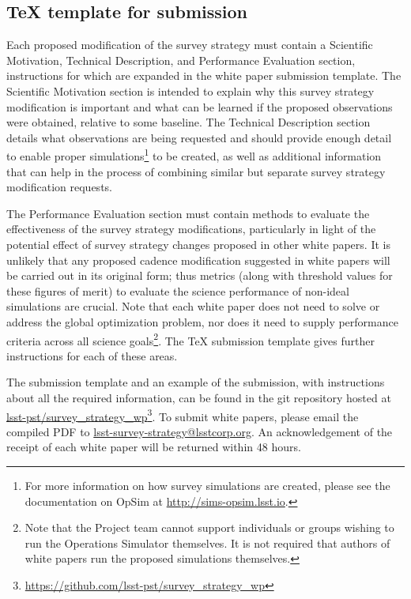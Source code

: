 \documentclass[DM,lsstdraft,toc,usenatbib]{lsstdoc}
\begin{document}
\subsection{TeX template for submission \label{sec:textemplate}} 

Each proposed modification of the survey strategy must contain a Scientific Motivation, Technical Description, and Performance Evaluation section, instructions for which are expanded in the white paper submission template. The Scientific Motivation section is intended to explain why this survey strategy modification is important and what can be learned if the proposed observations were obtained, relative to some baseline. The Technical Description section details what observations are being requested and should provide enough detail to enable proper simulations\footnote{For more information on how survey simulations are created, please see the documentation on OpSim at \href{http://sims-opsim.lsst.io}{http://sims-opsim.lsst.io}.} to be created, as well as additional information that can help in the process of combining similar but separate survey strategy modification requests. 

The Performance Evaluation section must contain methods to evaluate the effectiveness of the survey strategy modifications, particularly in light of the potential effect of survey strategy changes proposed in other white papers. It is unlikely that any proposed cadence modification suggested in white papers will be carried out in its original form; thus metrics (along with threshold values for these figures of merit) to evaluate the science performance of non-ideal simulations are crucial.  Note that each white paper does not need to solve or address the global optimization problem, nor does it need to supply performance criteria across all science goals\footnote{Note that 
the Project team cannot support individuals or groups wishing to run the Operations Simulator themselves. It is not required that authors of white papers run the proposed simulations themselves.}. The TeX submission template gives further instructions for each of these areas.

The submission template and an example of the submission, with instructions about
all the required information, can be found in the git repository hosted at \href{https://github.com/lsst-pst/survey_strategy_wp}{lsst-pst/survey\_strategy\_wp}\footnote{\url{https://github.com/lsst-pst/survey_strategy_wp}}.
To submit white papers, please email the compiled PDF to \href{lsst-survey-strategy@lsstcorp.org}{lsst-survey-strategy@lsstcorp.org}. An acknowledgement
of the receipt of each white paper will be returned within 48 hours.
\end{document}
